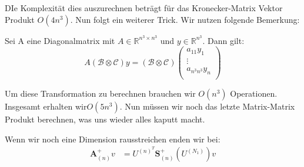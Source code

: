 DIe Komplexität dies auszurechnen beträgt für das Kronecker-Matrix Vektor Produkt $O(4n^3)$. Nun folgt ein weiterer Trick. Wir nutzen folgende Bemerkung:

\begin{Bemerkung}
Sei A eine Diagonalmatrix mit $A \in \mathbb{R}^{n^3 \times n^3}$ und $y \in \mathbb{R}^{n^3}$. Dann gilt:
\begin{equation*}
A(\mathcal{B} \otimes \mathcal{C})y = (\mathcal{B} \otimes \mathcal{C}) 
\begin{pmatrix}
a_{11} y_1 \\ \vdots \\ a_{n^3 n^3} y_n \\
\end{pmatrix}
\end{equation*}
\end{Bemerkung}

Um diese Transformation zu berechnen brauchen wir $O(n^3)$ Operationen. Insgesamt erhalten wir$ O(5n^3)$. Nun müssen wir noch das letzte Matrix-Matrix Produkt berechnen, was uns wieder alles kaputt macht.

Wenn wir noch eine Dimension rausstreichen enden wir bei:
\begin{equation}
\begin{aligned}
\mathcal{\textbf{A}}^{+}_{(n)}v&= U^{ (n) ^{T} }  \mathcal{\textbf{S}}^{+}_{(n)} ( U^{ (N_{1})  } ) v
\end{aligned}
\end{equation}